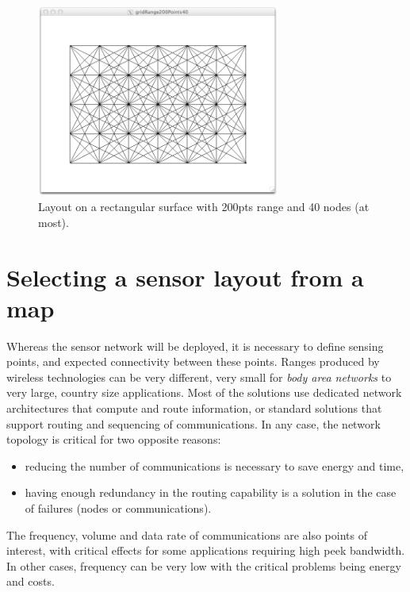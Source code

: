 \documentclass[times,a4paper]{book}
\begin{document}
\begin{figure}[hbtp]
\begin{center} 
\includegraphics[width=8cm]{GridRange200Points40.png}
\caption{Layout on a rectangular surface with 200pts range and 40 nodes (at most).}
\label{fig:GridRange200Points40}
\end{center}
\end{figure}


\section{Selecting a sensor layout from a map}

Whereas the sensor network will be deployed, it is necessary to define sensing points,
and expected connectivity between these points. Ranges produced by wireless technologies
can be very different, very small for {\sl body area networks} to very large, country size applications.
Most of the solutions use dedicated network architectures that compute and route information, 
or standard solutions that support routing and sequencing of communications.
In any case, the network topology is critical for two opposite reasons:

\begin{itemize}
\item reducing the number of communications is necessary to save energy and time,

\item having enough redundancy in the routing capability is a solution in the case
of failures (nodes or communications).
\end{itemize}

The frequency, volume and data rate of communications are also   points of interest, with
critical effects for  
some applications requiring high peek bandwidth. In other cases, frequency
can be very low  
with the critical problems being  energy and costs.
\end{document}
